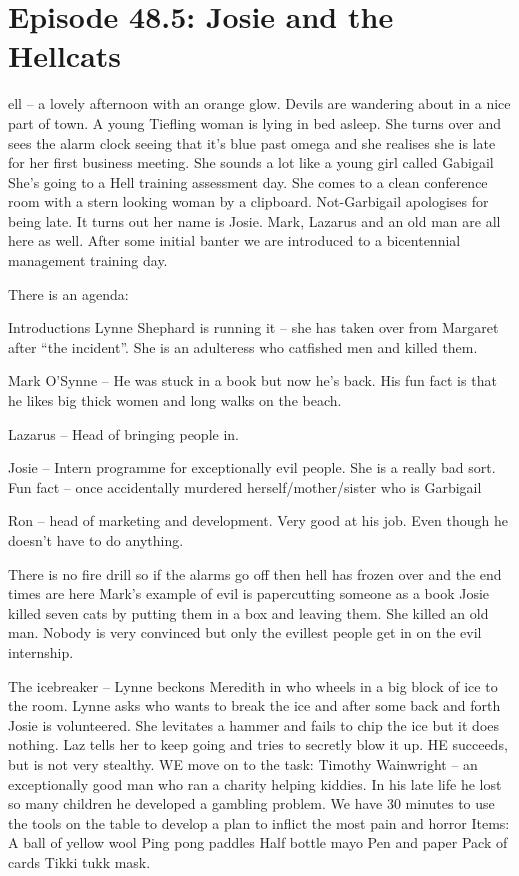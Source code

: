 \section{Episode 48.5: Josie and the Hellcats}

\begin{multicols}{2}

ell – a lovely afternoon with an orange glow. Devils are wandering about in a nice part of town. A young Tiefling woman is lying in bed asleep. She turns over and sees the alarm clock seeing that it’s blue past omega and she realises she is late for her first business meeting. She sounds a lot like a young girl called Gabigail She’s going to a Hell training assessment day. She comes to a clean conference room with a stern looking woman by a clipboard. Not-Garbigail apologises for being late. It turns out her name is Josie. Mark, Lazarus and an old man are all here as well. After some initial banter we are introduced to a bicentennial management training day. \medskip

There is an agenda:\medskip

Introductions Lynne Shephard is running it – she has taken over from Margaret after “the incident”. She is an adulteress who catfished men and killed them.\medskip

Mark O’Synne – He was stuck in a book but now he’s back. His fun fact is that he likes big thick women and long walks on the beach.\medskip

Lazarus – Head of bringing people in.\medskip

Josie – Intern programme for exceptionally evil people. She is a really bad sort. Fun fact – once accidentally murdered herself/mother/sister who is Garbigail\medskip

Ron – head of marketing and development. Very good at his job. Even though he doesn’t have to do anything.\medskip

There is no fire drill so if the alarms go off then hell has frozen over and the end times are here Mark’s example of evil is papercutting someone as a book Josie killed seven cats by putting them in a box and leaving them. She killed an old man. Nobody is very convinced but only the evillest people get in on the evil internship. \medskip

The icebreaker – Lynne beckons Meredith in who wheels in a big block of ice to the room. Lynne asks who wants to break the ice and after some back and forth Josie is volunteered. She levitates a hammer and fails to chip the ice but it does nothing. Laz tells her to keep going and tries to secretly blow it up. HE succeeds, but is not very stealthy. WE move on to the task: Timothy Wainwright – an exceptionally good man who ran a charity helping kiddies. In his late life he lost so many children he developed a gambling problem. We have 30 minutes to use the tools on the table to develop a plan to inflict the most pain and horror Items: A ball of yellow wool Ping pong paddles Half bottle mayo Pen and paper Pack of cards Tikki tukk mask. \medskip


\end{multicols}
